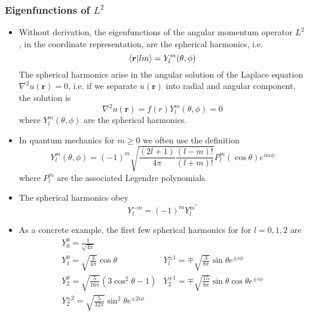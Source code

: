 \documentclass[11pt, a4paper]{article}
\renewcommand{\laplacian}{\nabla^{2}}
\renewcommand{\vec}[1]{\bm{#1}}  %
\renewcommand{\r}{\vec{r}}  %
\begin{document}
\subsubsection{Eigenfunctions of $ L^{2} $}
\begin{itemize}
	\item Without derivation, the eigenfunctions of the angular momentum operator $ L^{2} $, in the coordinate representation, are the spherical harmonics, i.e.
	\begin{equation*}
		\braket{\r}{lm} = Y_{l}^{m}(\theta, \phi) 
	\end{equation*}
	The spherical harmonics arise in the angular solution of the Laplace equation $ \laplacian u(\r) = 0 $, i.e. if we separate $ u(\r) $ into radial and angular component, the solution is
	\begin{equation*}
		\laplacian u(\r) = f(r)Y_{l}^{m}(\theta, \phi) = 0
	\end{equation*}
	where $ Y_{l}^{m}(\theta, \phi)  $ are the spherical harmonics. 
	
	\item In quantum mechanics for $ m \geq 0  $ we often use the definition
	\begin{equation*}
		Y_{l}^{m}(\theta, \phi) = (-1)^{m}\sqrt{\frac{(2l+1)}{4\pi}\frac{(l-m)!}{(l+m)!}} P_{l}^{m}(\cos \theta)e^{im\phi}
	\end{equation*}
	where $ P_{l}^{m} $ are the associated Legendre polynomials.
	
	\item The spherical harmonics obey 
	\begin{equation*}
		Y_{l}^{-m} = (-1)^{m}Y_{l}^{m^{*}}
	\end{equation*}
	
	\item As a concrete example, the first few spherical harmonics for for $ l = 0, 1, 2 $ are
	\[
		\begin{array}{ll}
			Y_{0}^{0} = \frac{1}{\sqrt{4\pi}} &\\
			Y_{1}^{0} = \sqrt{\frac{3}{4\pi}}\cos \theta & Y_{l}^{\pm 1} = \mp \sqrt{\frac{3}{8\pi}}\sin \theta e^{\pm i \phi}\\
			Y_{2}^{0} = \sqrt{\frac{5}{16\pi}}  (3\cos^{2}\theta - 1) & Y_{2}^{\pm 1} = \mp \sqrt{\frac{15}{8\pi}}\sin \theta \cos \theta e^{\pm i \phi}\\
			Y_{2}^{\pm 2} = \sqrt{\frac{5}{32\pi}}\sin^{2}\theta e^{\pm 2i \phi}
		\end{array}
	\]
\end{itemize}
\end{document}
